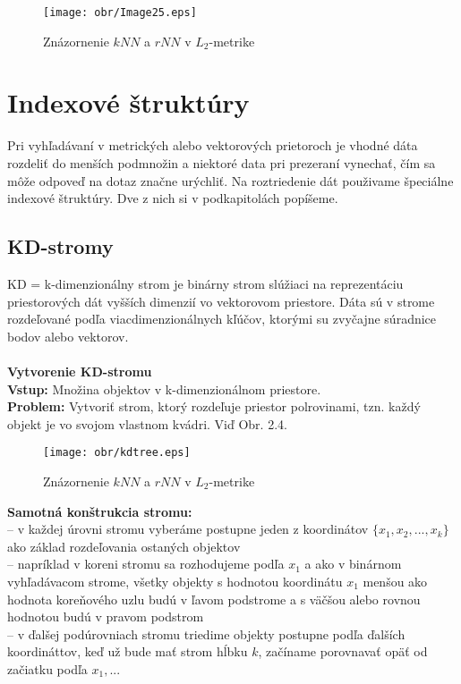 \documentclass[12pt,oneside]{fithesis2}
\begin{document}
	\begin{figure}
  		\centering
  		\texttt{[image: obr/Image25.eps]}
  		\caption{Znázornenie $kNN$ a $rNN$ v $L_2$-metrike}
	\end{figure}  

\section{Indexové štruktúry}

Pri vyhľadávaní v metrických alebo vektorových prietoroch je vhodné dáta rozdeliť do menších podmnožin a niektoré data pri prezeraní vynechať, čím sa môže odpoveď na dotaz značne urýchliť. Na roztriedenie dát použivame špeciálne indexové štruktúry. Dve z nich si v podkapitolách popíšeme.
\subsection{KD-stromy}
KD = k-dimenzionálny strom je binárny strom slúžiaci na reprezentáciu priestorových dát vyšších dimenzií vo vektorovom priestore. Dáta sú v strome rozdeľované podľa viacdimenzionálnych kľúčov, ktorými su zvyčajne súradnice bodov alebo vektorov. \\ \\
\textbf{Vytvorenie KD-stromu}\\
\textbf{Vstup:} Množina objektov v k-dimenzionálnom priestore. \\
\textbf{Problem:} Vytvoriť strom, ktorý rozdeľuje priestor polrovinami, tzn. každý objekt je vo svojom vlastnom kvádri. Viď Obr. 2.4.\\
\begin{figure}
  		\centering
  		\texttt{[image: obr/kdtree.eps]}
  		\caption{Znázornenie $kNN$ a $rNN$ v $L_2$-metrike}
\end{figure}
\textbf{Samotná konštrukcia stromu:} \\ 
-- v každej úrovni stromu vyberáme postupne jeden z koordinátov $ \{ x_1,x_2,...,x_k \} $ ako základ rozdeľovania ostaných objektov \\
-- napríklad v koreni stromu sa rozhodujeme podľa $x_1$ a ako v binárnom vyhľadávacom strome, všetky objekty s hodnotou koordinátu $x_1$ menšou ako hodnota koreňového uzlu budú v ľavom podstrome a s väčšou alebo rovnou hodnotou budú v pravom podstrom \\
-- v ďalšej podúrovniach stromu triedime objekty postupne podľa ďalších koordináttov, keď už bude mať strom hĺbku $k$, začíname porovnavať opäť od začiatku podľa $x_1,...$ \\
\end{document}
